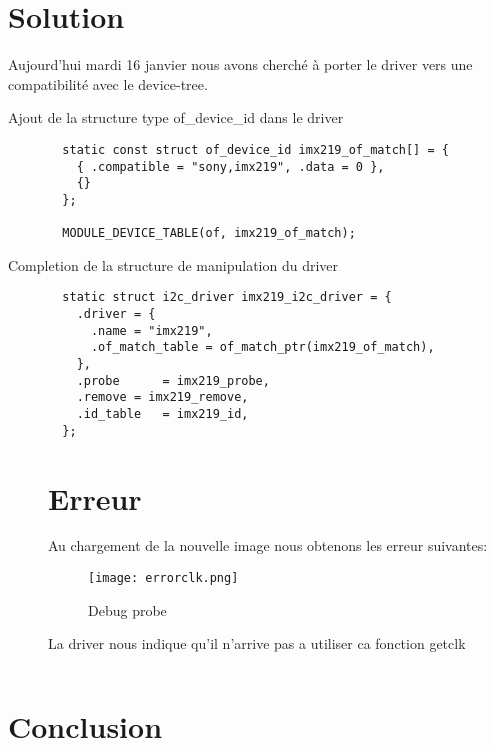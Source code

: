 \section{Solution}
Aujourd'hui mardi 16 janvier nous avons cherché à porter le driver vers
une compatibilité avec le device-tree.
\begin{description}

  \item[Ajout de la structure type of\_device\_id dans le driver]

  \begin{lstlisting}
  static const struct of_device_id imx219_of_match[] = {
    { .compatible = "sony,imx219", .data = 0 },
    {}
  };

  MODULE_DEVICE_TABLE(of, imx219_of_match);
  \end{lstlisting}

  \item[Completion de la structure de manipulation du driver]

  \begin{lstlisting}
  static struct i2c_driver imx219_i2c_driver = {
    .driver = {
      .name = "imx219",
      .of_match_table = of_match_ptr(imx219_of_match),
    },
    .probe		= imx219_probe,
    .remove	= imx219_remove,
    .id_table	= imx219_id,
  };
  \end{lstlisting}

\section{Erreur}
Au chargement de la nouvelle image nous obtenons les erreur suivantes:

\begin{figure}[th]
  \centering
  \texttt{[image: errorclk.png]}
  \decoRule
  \caption{Debug probe}  \label{fig:planning}
\end{figure}

La driver nous indique qu'il n'arrive pas a utiliser ca fonction getclk

    \end{description}

    \begin{lstlisting}

    \end{lstlisting}

    \clearpage

    \section{Conclusion}

